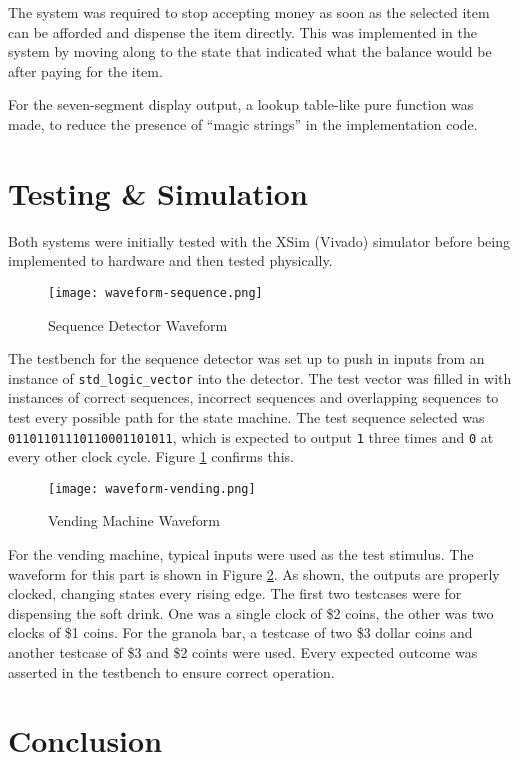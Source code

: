 \documentclass[12pt]{article}
\begin{document}
The system was required to stop accepting money as soon as the selected item can be afforded and dispense the item directly. This was implemented in the system by moving along to the state that indicated what the balance would be after paying for the item.

For the seven-segment display output, a lookup table-like pure function was made, to reduce the presence of ``magic strings'' in the implementation code.

\section{Testing \& Simulation}

Both systems were initially tested with the XSim (Vivado) simulator before being implemented to hardware and then tested physically.

\begin{figure}[h]
  \texttt{[image: waveform-sequence.png]}
  \caption{Sequence Detector Waveform}
  \label{fig:waveform-sequence}
\end{figure}

The testbench for the sequence detector was set up to push in inputs from an instance of \verb|std_logic_vector| into the detector. The test vector was filled in with instances of correct sequences, incorrect sequences and overlapping sequences to test every possible path for the state machine.
The test sequence selected was \verb|01101101110110001101011|, which is expected to output \verb|1| three times and \verb|0| at every other clock cycle. Figure \ref{fig:waveform-sequence} confirms this.

\begin{figure}[h]
  \texttt{[image: waveform-vending.png]}
  \caption{Vending Machine Waveform}
  \label{fig:waveform-vending}
\end{figure}

For the vending machine, typical inputs were used as the test stimulus. The waveform for this part is shown in Figure \ref{fig:waveform-vending}. As shown, the outputs are properly clocked, changing states every rising edge. The first two testcases were for dispensing the soft drink. One was a single clock of \$2 coins, the other was two clocks of \$1 coins. For the granola bar, a testcase of two \$3 dollar coins and another testcase of \$3 and \$2 coints were used. Every expected outcome was asserted in the testbench to ensure correct operation.

\section{Conclusion}
\end{document}
